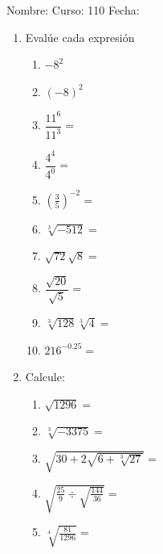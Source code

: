 \documentclass[fleqn]{article}
\newcommand{\LineaNombre}{%
\par
\vspace{\baselineskip}
Nombre:\hrulefill \; Curso: 110\underline{\hspace*{12pt}} \; Fecha: \underline{\hspace*{2.5cm}} \relax
\par}
\begin{document}
\LineaNombre
\begin{enumerate}
   \item Evalúe cada expresión
   \begin{enumerate}
   \item $-8^{2}$\noanswer
   \item $(-8)^{2}$\noanswer
   \item $\dfrac{11^{6}}{11^{3}}=$ \noanswer
   \item $\dfrac{4^{4}}{4^{0}}=$ \noanswer
   \item $(\frac{3}{5})^{-2}=$ \noanswer
   \item $\sqrt[3]{-512}=$\noanswer
   \item $\sqrt{72}\sqrt{8}=$\noanswer
   \item $\dfrac{\sqrt{20}}{\sqrt{5}}=$\noanswer
   \item $\sqrt[3]{128}\sqrt[3]{4}=$\noanswer
   \item $216^{-0.25}=$\noanswer
   \end{enumerate}
   \newpage
   \item Calcule:
   \begin{enumerate}
   \item $\sqrt{1296}=$\noanswer
   \item $\sqrt[3]{-3375}=$\noanswer
   \item $\sqrt{30+2\sqrt{6+\sqrt[3]{27}}}=$\noanswer
   \item $\sqrt{\frac{25}{9}\div\sqrt{\frac{144}{36}}}=$\noanswer
   \item $\sqrt[4]{\frac{81}{1296}}=$\noanswer
   \end{enumerate}
   \end{enumerate}
\end{document}
